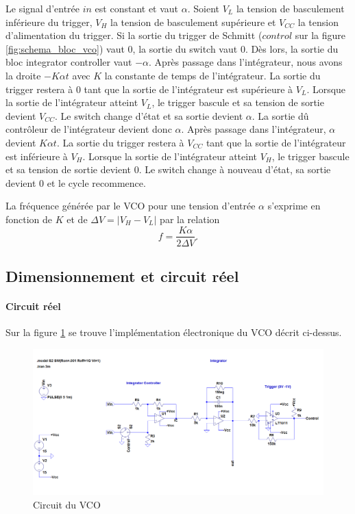 Le signal d'entrée $in$ est constant et vaut $\alpha$. Soient $V_L$ la
tension de basculement inférieure du trigger, $V_H$ la tension de 
basculement supérieure et $V_{CC}$ la tension d'alimentation du trigger.
Si la sortie du trigger de Schmitt ($control$ sur la figure \ref{fig:schema_bloc_vco}) 
vaut $0$, la sortie du switch vaut $0$. Dès lors, la sortie du bloc
integrator controller vaut $-\alpha$. Après passage dans l'intégrateur, nous avons la 
droite $-K\alpha t$ avec $K$ la constante de temps de l'intégrateur. La sortie du trigger
restera à $0$ tant que la sortie de l'intégrateur est supérieure à $V_L$. Lorsque la sortie
de l'intégrateur atteint $V_L$, le trigger bascule et sa tension de sortie devient $V_{CC}$. 
Le switch change d'état et sa sortie devient $\alpha$. La sortie dû contrôleur de l'intégrateur
devient donc $\alpha$. Après passage dans l'intégrateur, $\alpha$ devient $K\alpha t$. 
La sortie du trigger restera à $V_{CC}$ tant que la sortie de l'intégrateur est inférieure à $V_H$.
Lorsque la sortie de l'intégrateur atteint $V_H$, le trigger bascule et sa tension de sortie devient
$0$. Le switch change à nouveau d'état, sa sortie devient $0$ et le cycle recommence.

La fréquence générée par le VCO pour une tension d'entrée $\alpha$ s'exprime 
en fonction de $K$ et de $\Delta V = \vert V_H - V_L\vert $ par la relation 
\[ f = \frac{K\alpha}{2\Delta V}. \]

\subsection{Dimensionnement et circuit réel}
\paragraph{Circuit réel}
Sur la figure \ref{fig:circuit_vco} se trouve l'implémentation électronique du VCO décrit ci-dessus.

\begin{figure}[ht]
	\centering
	\includegraphics[scale=0.3]{img-vco/vco_circuit}
	\caption{Circuit du VCO}
	\label{fig:circuit_vco}
\end{figure}

